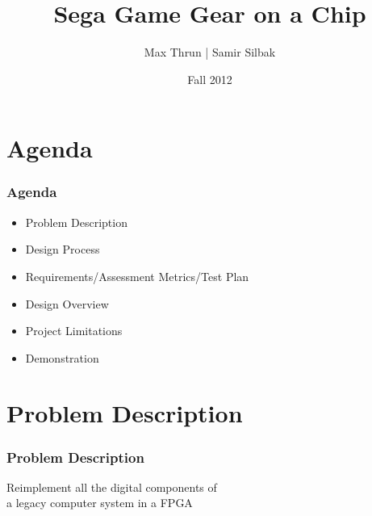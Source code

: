 \documentclass{beamer}
\title{Sega Game Gear on a Chip}
\author{Max Thrun | Samir Silbak}
\institute{University of Cincinnati}
\date{Fall 2012}
\newlength{\wideitemsep}
\let\olditem\item
\renewcommand{\item}{\setlength{\itemsep}{\wideitemsep}\olditem}
\begin{document}
\maketitle

%
%

\section{Agenda}
\begin{frame}
\frametitle{Agenda}
    \begin{itemize}
        \item Problem Description
        \item Design Process
        \item Requirements/Assessment Metrics/Test Plan
        \item Design Overview
        \item Project Limitations
        \item Demonstration
    \end{itemize}
\end{frame}

\section{Problem Description}
\begin{frame}
    \frametitle{Problem Description}
    \begin{center}
        \Large
        Reimplement all the digital components of \\a legacy computer system in a FPGA
    \end{center}
\end{frame}
\end{document}
